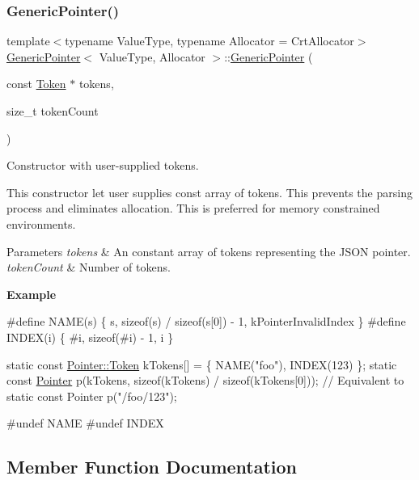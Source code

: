 \subsubsection{\texorpdfstring{Generic\+Pointer()}{GenericPointer()}\hspace{0.1cm}{\footnotesize\ttfamily [3/3]}}
{\footnotesize\ttfamily template$<$typename Value\+Type, typename Allocator = Crt\+Allocator$>$ \\
\hyperlink{a02232}{Generic\+Pointer}$<$ Value\+Type, Allocator $>$\+::\hyperlink{a02232}{Generic\+Pointer} (\begin{DoxyParamCaption}\item[{const \hyperlink{a02308}{Token} $\ast$}]{tokens,  }\item[{size\+\_\+t}]{token\+Count }\end{DoxyParamCaption})\hspace{0.3cm}{\ttfamily [inline]}}



Constructor with user-\/supplied tokens. 

This constructor let user supplies const array of tokens. This prevents the parsing process and eliminates allocation. This is preferred for memory constrained environments.


\begin{DoxyParams}{Parameters}
{\em tokens} & An constant array of tokens representing the J\+S\+ON pointer. \\
\hline
{\em token\+Count} & Number of tokens.\\
\hline
\end{DoxyParams}
{\bfseries Example} 
\begin{DoxyCode}
\textcolor{preprocessor}{#define NAME(s) \{ s, sizeof(s) / sizeof(s[0]) - 1, kPointerInvalidIndex \}}
\textcolor{preprocessor}{#define INDEX(i) \{ #i, sizeof(#i) - 1, i \}}

\textcolor{keyword}{static} \textcolor{keyword}{const} \hyperlink{a02308}{Pointer::Token} kTokens[] = \{ NAME(\textcolor{stringliteral}{"foo"}), INDEX(123) \};
\textcolor{keyword}{static} \textcolor{keyword}{const} \hyperlink{a02232}{Pointer} p(kTokens, \textcolor{keyword}{sizeof}(kTokens) / \textcolor{keyword}{sizeof}(kTokens[0]));
\textcolor{comment}{// Equivalent to static const Pointer p("/foo/123");}

\textcolor{preprocessor}{#undef NAME}
\textcolor{preprocessor}{#undef INDEX}
\end{DoxyCode}
 

\subsection{Member Function Documentation}
\mbox{\label{a02232_aa8f86c0f330807f337351a95ae254b78}} 
